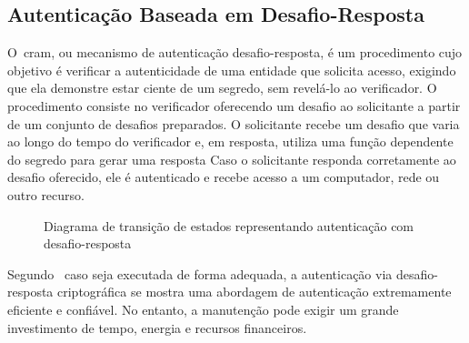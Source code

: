\subsection{Autenticação Baseada em Desafio-Resposta}
\label{subsec:autenticacao-desafio-resposta}

O~\acrfull{cram}, ou mecanismo de autenticação desafio-resposta, é um
procedimento
cujo objetivo é verificar a autenticidade de uma entidade que solicita acesso,
exigindo que ela demonstre estar ciente de um segredo, sem revelá-lo ao
verificador.
O procedimento consiste no verificador oferecendo um desafio ao solicitante a
partir de um conjunto de desafios preparados.
O solicitante recebe um desafio que varia ao longo do tempo do verificador e,
em resposta, utiliza uma função dependente do segredo para gerar uma resposta
Caso o solicitante responda corretamente ao desafio oferecido, ele é autenticado
e recebe acesso a um computador, rede ou outro recurso\cite{gilad2013}.

\begin{figure}[h!]
    \centering
    \caption[Diagrama representação autenticação via desafio-resposta]
    {Diagrama de transição de estados representando autenticação com
    desafio-resposta}
    \label{fig:diagrama-autenticacao-desafio-resposta}
\end{figure}

Segundo~\textcite{idrus2013} caso seja executada de forma adequada, a autenticação
via desafio-resposta criptográfica se mostra uma abordagem de autenticação extremamente
eficiente e confiável.
No entanto, a manutenção pode exigir um grande investimento de tempo, energia e
recursos financeiros.